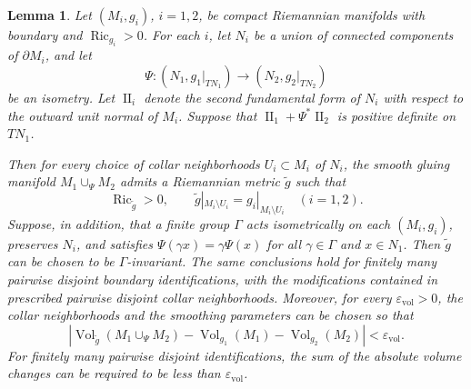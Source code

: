 \documentclass[11pt,reqno]{amsart}
\newtheorem{lemma}[theorem]{Lemma}
\theoremstyle{definition}
\numberwithin{equation}{section}
\DeclareMathOperator{\Ric}{Ric}
\DeclareMathOperator{\II}{II}
\begin{document}
\begin{lemma}
\label{lem:relative-gluing-unified}
Let $(M_i,g_i)$, $i=1,2$, be compact Riemannian manifolds with boundary
and $\Ric_{g_i}>0$.  For each $i$, let $N_i$ be a union of connected
components of $\partial M_i$, and let
\[
 \Psi:(N_1,g_1|_{TN_1})\longrightarrow(N_2,g_2|_{TN_2})
\]
be an isometry.  Let $\II_i$ denote the second fundamental form of $N_i$
with respect to the outward unit normal of $M_i$.  Suppose that
$\II_1+\Psi^*\II_2$ is positive definite on $TN_1$.

Then for every choice of collar neighborhoods $U_i\subset M_i$ of $N_i$,
the smooth gluing manifold $M_1\cup_\Psi M_2$ admits a Riemannian metric
$\widetilde g$ such that
\[
 \Ric_{\widetilde g}>0,
 \qquad \widetilde g|_{M_i\setminus U_i}=g_i|_{M_i\setminus U_i}
 \quad(i=1,2).
\]
Suppose, in addition, that a finite group $\Gamma$ acts isometrically on
each $(M_i,g_i)$, preserves $N_i$, and satisfies
$\Psi(\gamma x)=\gamma\Psi(x)$ for all $\gamma\in\Gamma$ and
$x\in N_1$.  Then $\widetilde g$ can be chosen to be $\Gamma$-invariant.  The
same conclusions hold for finitely many pairwise disjoint boundary
identifications, with the modifications contained in prescribed
pairwise disjoint collar neighborhoods.
Moreover, for every \(\varepsilon_{\mathrm{vol}}>0\), the collar
neighborhoods and the smoothing parameters can be chosen so that
\begin{equation}\label{eq:volume pinching}
 \left|
 \operatorname{Vol}_{\widetilde g}(M_1\cup_\Psi M_2)
 -\operatorname{Vol}_{g_1}(M_1)
 -\operatorname{Vol}_{g_2}(M_2)
 \right|<\varepsilon_{\mathrm{vol}}.
\end{equation}
For finitely many pairwise disjoint identifications, the sum of the
absolute volume changes can be required to be less than
\(\varepsilon_{\mathrm{vol}}\).
\end{lemma}
\end{document}
